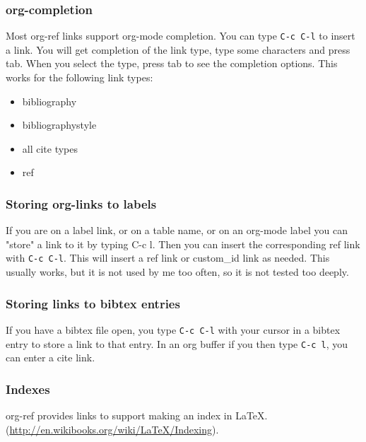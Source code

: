 \documentclass[11pt]{article}
\begin{document}
\subsubsection{org-completion}
\label{sec:org11ad8b7}
 

Most org-ref links support org-mode completion. You can type \texttt{C-c C-l} to insert a link. You will get completion of the link type, type some characters and press tab. When you select the type, press tab to see the completion options. This works for the following link types:

\begin{itemize}
\item bibliography
\item bibliographystyle
\item all cite types
\item ref
\end{itemize}

\subsubsection{Storing org-links to labels}
\label{sec:orgcdc8ae6}

If you are on a label link, or on a table name, or on an org-mode label you can "store" a link to it by typing C-c l. Then you can insert the corresponding ref link with \texttt{C-c C-l}. This will insert a ref link or custom\_id link as needed. This usually works, but it is not used by me too often, so it is not tested too deeply.

\subsubsection{Storing links to bibtex entries}
\label{sec:orgbf424e1}

If you have a bibtex file open, you type \texttt{C-c C-l} with your cursor in a bibtex entry to store a link to that entry. In an org buffer if you then type \texttt{C-c l}, you can enter a cite link.

\subsubsection{Indexes}
\label{sec:org97fabbe}

org-ref provides links to support making an index in \LaTeX{}. (\url{http://en.wikibooks.org/wiki/LaTeX/Indexing}).
\end{document}
